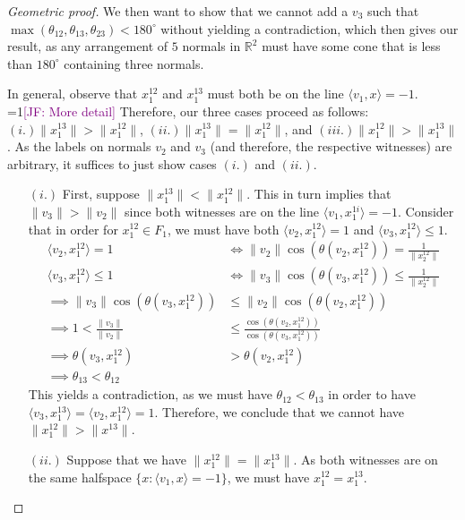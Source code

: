 \documentclass[anon]{colt2020} %
\newcommand{\Comments}{1}
\newcommand{\mynote}[2]{\ifnum\Comments=1\textcolor{#1}{#2}\fi}
\newcommand{\jessie}[1]{\mynote{purple}{[JF: #1]}}
\newcommand{\reals}{\mathbb{R}}
\newcommand{\inprod}[2]{\langle #1, #2 \rangle}%
\begin{document}
\begin{proof}[Geometric proof]
  We then want to show that we cannot add a $v_3$ such that $\max(\theta_{12}, \theta_{13}, \theta_{23}) < 180^\circ$ without yielding a contradiction, which then gives our result, as any arrangement of $5$ normals in $\reals^2$ must have some cone that is less than $180^\circ$ containing three normals.

  In general, observe that $x^{12}_1$ and $x^{13}_1$ must both be on the line $\inprod{v_1}{x} = -1$. \jessie{More detail}
  Therefore, our three cases proceed as follows: $(i.) \|x^{13}_1\| > \|x^{12}_1\|$, $(ii.) \|x^{13}_1\| = \|x^{12}_1\|$, and $(iii.) \|x^{12}_1\| > \|x^{13}_1\|$.
  As the labels on normals $v_2$ and $v_3$ (and therefore, the respective witnesses) are arbitrary, it suffices to just show cases $(i.)$ and $(ii.)$.

  \begin{enumerate}
  \item [$(i.)$] First, suppose $\|x^{13}_1\| < \|x^{12}_1\|$.
  This in turn implies that $\|v_3\| > \|v_2\|$ since both witnesses are on the line $\inprod{v_1}{x^{1i}_1} = -1$.
  Consider that in order for $x^{12}_1 \in F_1$, we must have both $\inprod{v_2}{x^{12}_1} = 1$ and $\inprod{v_3}{x^{12}_1} \leq 1$.
    \begin{align*}
    \inprod{v_2}{x^{12}_1} = 1 &\iff \|v_2\| \cos(\theta(v_2, x^{12}_1)) = \frac 1 {\|x^{12}_2\|}\\
    \inprod{v_3}{x^{12}_1} \leq 1 &\iff \|v_3\| \cos(\theta(v_3, x^{12}_1)) \leq \frac 1 {\|x^{12}_2\|}\\
\implies \|v_3\| \cos(\theta(v_3, x^{12}_1)) &\leq \|v_2\| \cos(\theta(v_2, x^{12}_1))\\
\implies 1 < \frac{\|v_3\|}{\|v_2\|} &\leq \frac{\cos(\theta(v_2, x^{12}_1))}{\cos(\theta(v_3, x^{12}_1))}\\
\implies \theta(v_3, x^{12}_1) &> \theta(v_2, x^{12}_1)\\
\implies \theta_{13} < \theta_{12}
    \end{align*}
    This yields a contradiction, as we must have $\theta_{12} < \theta_{13}$ in order to have $\inprod{v_3}{x^{13}_1} = \inprod{v_2}{x^{12}_1} = 1$.
    Therefore, we conclude that we cannot have $\|x^{12}_1\| > \|x^{13}\|$.
  	\item [$(ii.)$] Suppose that we have $\|x^{12}_1\| = \|x^{13}_1\|$.
  	As both witnesses are on the same halfspace $\{x : \inprod{v_1}{x} = -1\}$, we must have $x^{12}_1 = x^{13}_1$.

  \end{enumerate}


\end{proof}
\end{document}

